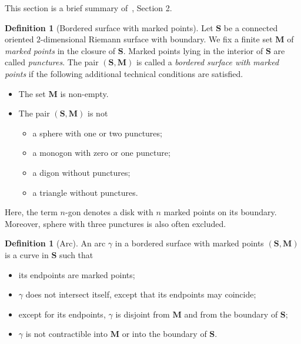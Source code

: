 \documentclass[a4paper,oneside,svgnames,draft]{amsart}
\theoremstyle{plain}
\theoremstyle{definition}
\newtheorem{definition}[theorem]{Definition}
\begin{document}
 This section is a brief summary of~\cite{fst}, Section 2.
 \begin{definition}[Bordered surface with marked points]
  \label{def:marked-surface}
  Let $\mathbf{S}$ be a connected oriented $2$-dimensional Riemann surface with
  boundary. We fix a finite set $\mathbf{M}$ of \emph{marked points} in the
  closure of $\mathbf{S}$. Marked points lying in the interior of $\mathbf{S}$
  are called \emph{punctures}. The pair $(\mathbf{S},\mathbf{M})$ is called a
  \emph{bordered surface with marked points} if the following additional
  technical conditions are satisfied.
  \begin{itemize}
   \item The set $\mathbf{M}$ is non-empty.
   \item The pair $(\mathbf{S}, \mathbf{M})$ is not
   \begin{itemize}
    \item a sphere with one or two punctures;
    \item a monogon with zero or one puncture;
    \item a digon without punctures;
    \item a triangle without punctures.
   \end{itemize}
  \end{itemize}
  Here, the term $n$-gon denotes a disk with $n$ marked points on its boundary.
  Moreover, sphere with three punctures is also often excluded.
 \end{definition}

 \begin{definition}[Arc]
  \label{def:arc}
  An arc $\gamma$ in a bordered surface with marked points
  $(\mathbf{S},\mathbf{M})$ is a curve in $\mathbf{S}$ such that
  \begin{itemize}
   \item its endpoints are marked points;
   \item $\gamma$ does not intersect itself, except that its endpoints may
    coincide;
   \item except for its endpoints, $\gamma$ is disjoint from $\mathbf{M}$ and
    from the boundary of $\mathbf{S}$;
   \item $\gamma$ is not contractible into $\mathbf{M}$ or into the boundary of
    $\mathbf{S}$.
  \end{itemize}
 \end{definition}
\end{document}

